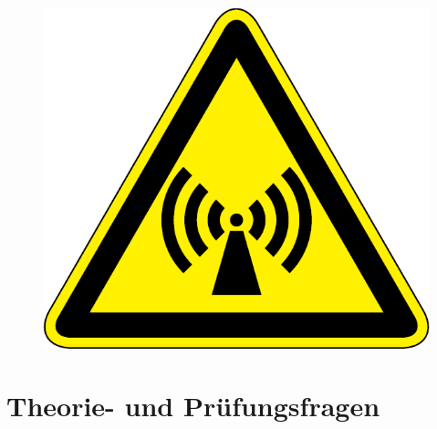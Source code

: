 \begin{figure}
	\vspace{-6cm}
  	\includegraphics[scale=0.2]{EMV/Bilder/Symbol_Nichtionisierende_Strahlung}
  	\vspace{-6cm}
	\end{figure}

\section*{Theorie- und Prüfungsfragen}


